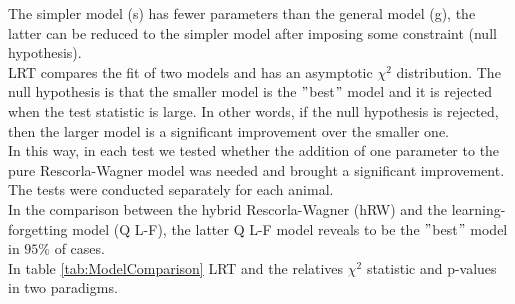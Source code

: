 The simpler model (s) has fewer parameters than the general model (g), the latter can be reduced to the simpler model after imposing some constraint (null hypothesis).\\LRT compares the fit of two models and has an asymptotic $\chi^2$ distribution. The null hypothesis is that the smaller model is the $"$best$"$ model and it is rejected when the test statistic is large. In other words, if the null hypothesis is rejected, then the larger model is a significant improvement over the smaller one.\\In this way, in each test we tested whether the addition of one parameter to the pure Rescorla-Wagner model was needed and brought a significant improvement. The tests were conducted separately for each animal.\\In the comparison between the hybrid Rescorla-Wagner (hRW) and the learning-forgetting model (Q L-F), the latter Q L-F model reveals to be the $"$best$"$ model in $95\%$ of cases.\\In table \ref{tab:ModelComparison} LRT and the relatives $\chi^2$ statistic and p-values in two paradigms.
